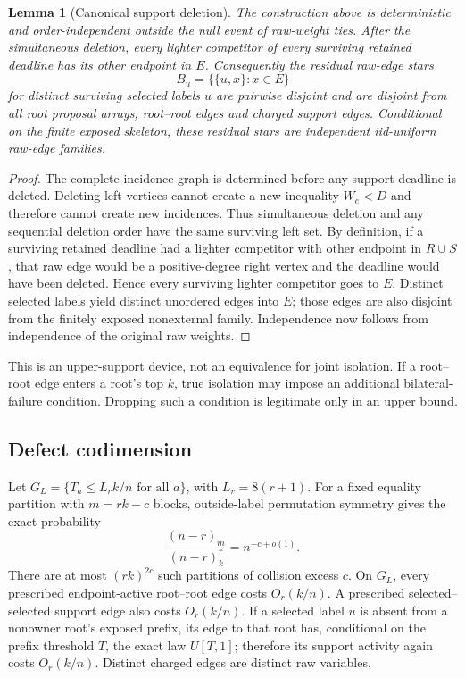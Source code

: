 \documentclass[11pt]{article}
\newtheorem{lemma}[theorem]{Lemma}
\newcommand{\1}{\mathbf 1}
\begin{document}
\begin{lemma}[Canonical support deletion]\label{lem:canonical}
The construction above is deterministic and order-independent outside the null event of
raw-weight ties.  After the simultaneous deletion, every lighter competitor of every
surviving retained deadline has its other endpoint in $E$.  Consequently the residual
raw-edge stars
\[
 B_u=\{\{u,x\}:x\in E\}
\]
for distinct surviving selected labels $u$ are pairwise disjoint and are disjoint from all
root proposal arrays, root--root edges and charged support edges.  Conditional on the
finite exposed skeleton, these residual stars are independent iid-uniform raw-edge
families.
\end{lemma}

\begin{proof}
The complete incidence graph is determined before any support deadline is deleted.
Deleting left vertices cannot create a new inequality $W_e<D$ and therefore cannot create
new incidences.  Thus simultaneous deletion and any sequential deletion order have the
same surviving left set.  By definition, if a surviving retained deadline had a lighter
competitor with other endpoint in $R\cup S$, that raw edge would be a positive-degree
right vertex and the deadline would have been deleted.  Hence every surviving lighter
competitor goes to $E$.  Distinct selected labels yield distinct unordered edges into $E$;
those edges are also disjoint from the finitely exposed nonexternal family.  Independence
now follows from independence of the original raw weights.
\end{proof}

This is an upper-support device, not an equivalence for joint isolation.  If a root--root
edge enters a root's top $k$, true isolation may impose an additional bilateral-failure
condition.  Dropping such a condition is legitimate only in an upper bound.

\subsection{Defect codimension}

Let $G_L=\{T_a\le L_r k/n\text{ for all }a\}$, with $L_r=8(r+1)$.
For a fixed equality partition with $m=rk-c$ blocks, outside-label permutation symmetry
gives the exact probability
\begin{equation}\label{eq:partition}
 \frac{(n-r)_m}{(n-r)_k^r}=n^{-c+o(1)}.
\end{equation}
There are at most $(rk)^{2c}$ such partitions of collision excess $c$.
On $G_L$, every prescribed endpoint-active root--root edge costs $O_r(k/n)$.
A prescribed selected--selected support edge also costs $O_r(k/n)$.
If a selected label $u$ is absent from a nonowner root's exposed prefix, its edge to that
root has, conditional on the prefix threshold $T$, the exact law $U[T,1]$; therefore its
support activity again costs $O_r(k/n)$.  Distinct charged edges are distinct raw variables.
\end{document}
